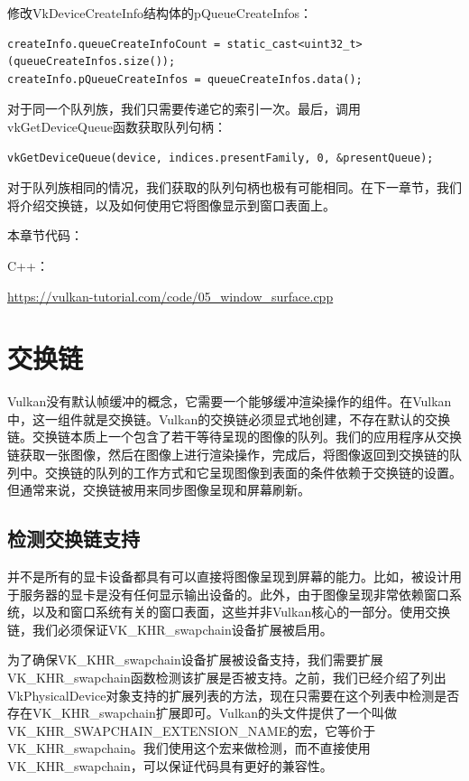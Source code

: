 \documentclass{ctexart}
\begin{document}
修改VkDeviceCreateInfo结构体的pQueueCreateInfos：

\begin{lstlisting}[language={[ANSI]C}]
createInfo.queueCreateInfoCount = static_cast<uint32_t>(queueCreateInfos.size());
createInfo.pQueueCreateInfos = queueCreateInfos.data();
\end{lstlisting}

对于同一个队列族，我们只需要传递它的索引一次。最后，调用vkGetDeviceQueue函数获取队列句柄：

\begin{lstlisting}[language={[ANSI]C}]
vkGetDeviceQueue(device, indices.presentFamily, 0, &presentQueue);
\end{lstlisting}

对于队列族相同的情况，我们获取的队列句柄也极有可能相同。在下一章节，我们将介绍交换链，以及如何使用它将图像显示到窗口表面上。

本章节代码：

C++：

\url{https://vulkan-tutorial.com/code/05_window_surface.cpp}

\newpage
\section{交换链}

Vulkan没有默认帧缓冲的概念，它需要一个能够缓冲渲染操作的组件。在Vulkan中，这一组件就是交换链。Vulkan的交换链必须显式地创建，不存在默认的交换链。交换链本质上一个包含了若干等待呈现的图像的队列。我们的应用程序从交换链获取一张图像，然后在图像上进行渲染操作，完成后，将图像返回到交换链的队列中。交换链的队列的工作方式和它呈现图像到表面的条件依赖于交换链的设置。但通常来说，交换链被用来同步图像呈现和屏幕刷新。

\subsection{检测交换链支持}

并不是所有的显卡设备都具有可以直接将图像呈现到屏幕的能力。比如，被设计用于服务器的显卡是没有任何显示输出设备的。此外，由于图像呈现非常依赖窗口系统，以及和窗口系统有关的窗口表面，这些并非Vulkan核心的一部分。使用交换链，我们必须保证VK\_KHR\_swapchain设备扩展被启用。

为了确保VK\_KHR\_swapchain设备扩展被设备支持，我们需要扩展VK\_KHR\_swapchain函数检测该扩展是否被支持。之前，我们已经介绍了列出VkPhysicalDevice对象支持的扩展列表的方法，现在只需要在这个列表中检测是否存在VK\_KHR\_swapchain扩展即可。Vulkan的头文件提供了一个叫做VK\_KHR\_SWAPCHAIN\_EXTENSION\_NAME的宏，它等价于VK\_KHR\_swapchain。我们使用这个宏来做检测，而不直接使用VK\_KHR\_swapchain，可以保证代码具有更好的兼容性。
\end{document}
